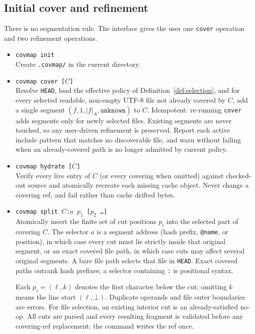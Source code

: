 \documentclass[11pt,a4paper]{article}
\begin{document}
\subsection{Initial cover and refinement}\label{sec:initial-cover}

There is no segmentation rule. The interface gives the user one
\texttt{cover} operation and two refinement operations.

\begin{itemize}[leftmargin=2em,itemsep=2pt]
\item \texttt{covmap init}\\
      Create \texttt{.covmap/} in the current directory.
\item \texttt{covmap cover [$C$]}\\
      Resolve \texttt{HEAD}, load the effective policy of
      Definition~\ref{def:selection}, and for every selected readable,
      non-empty UTF-8 file not already covered by $C$, add a single segment
      $(f, 1, |f|_A, \texttt{unknown})$ to $C$. Idempotent: re-running
      \texttt{cover} adds segments only for newly selected files. Existing
      segments are never touched, so any user-driven refinement is preserved.
      Report each active include pattern that matches no discoverable file,
      and warn without failing when an already-covered path is no longer
      admitted by current policy.
\item \texttt{covmap hydrate [$C$]}\\
      Verify every live entry of $C$ (or every covering when omitted) against
      checked-out source and atomically recreate each missing cache object.
      Never change a covering ref, and fail rather than cache drifted bytes.
\item \texttt{covmap split $C$:$a$ $p_1$ [$p_2$ \ldots]}\\
      Atomically insert the finite set of cut positions $p_i$ into the
      selected part of covering $C$. The selector $a$ is a segment address
      (hash prefix, \texttt{@name}, or position), in which case every cut
      must lie strictly inside that original segment, or an exact covered
      file path, in which case cuts may affect several original segments.
      A bare file path selects that file in \texttt{HEAD}. Exact covered
      paths outrank hash prefixes; a selector containing \texttt{:} is
      positional syntax.

      Each $p_i=(\ell,k)$ denotes the first character below the cut; omitting
      $k$ means the line start $(\ell,\bot)$. Duplicate operands and file
      outer boundaries are errors. For file selection, an existing interior
      cut is an already-satisfied no-op. All cuts are parsed and every
      resulting fragment is validated before any covering-ref replacement;
      the command writes the ref once.


\end{itemize}
\end{document}
